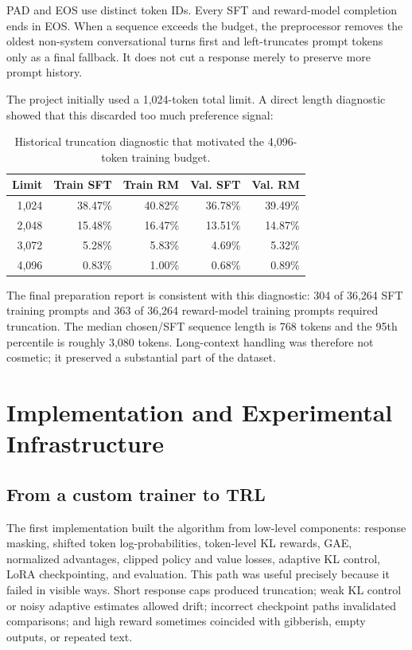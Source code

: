 \documentclass[11pt]{article}
\begin{document}
PAD and EOS use distinct token IDs. Every SFT and reward-model completion ends
in EOS. When a sequence exceeds the budget, the preprocessor removes the
oldest non-system conversational turns first and left-truncates prompt tokens
only as a final fallback. It does not cut a response merely to preserve more
prompt history.

The project initially used a 1,024-token total limit. A direct length
diagnostic showed that this discarded too much preference signal:

\begin{table}[H]
\centering
\caption{Historical truncation diagnostic that motivated the 4,096-token
training budget.}
\label{tab:length-diagnostic}
\begin{tabular}{@{}rrrrr@{}}
\toprule
\textbf{Limit} &
\textbf{Train SFT} &
\textbf{Train RM} &
\textbf{Val. SFT} &
\textbf{Val. RM}\\
\midrule
1,024 & 38.47\% & 40.82\% & 36.78\% & 39.49\%\\
2,048 & 15.48\% & 16.47\% & 13.51\% & 14.87\%\\
3,072 & 5.28\% & 5.83\% & 4.69\% & 5.32\%\\
4,096 & 0.83\% & 1.00\% & 0.68\% & 0.89\%\\
\bottomrule
\end{tabular}
\end{table}

The final preparation report is consistent with this diagnostic: 304 of
36,264 SFT training prompts and 363 of 36,264 reward-model training prompts
required truncation. The median chosen/SFT sequence length is 768 tokens and
the 95th percentile is roughly 3,080 tokens. Long-context handling was
therefore not cosmetic; it preserved a substantial part of the dataset.

\section{Implementation and Experimental Infrastructure}

\subsection{From a custom trainer to TRL}

The first implementation built the algorithm from low-level components:
response masking, shifted token log-probabilities, token-level KL rewards,
GAE, normalized advantages, clipped policy and value losses, adaptive KL
control, LoRA checkpointing, and evaluation. This path was useful precisely
because it failed in visible ways. Short response caps produced truncation;
weak KL control or noisy adaptive estimates allowed drift; incorrect
checkpoint paths invalidated comparisons; and high reward sometimes
coincided with gibberish, empty outputs, or repeated text.
\end{document}
